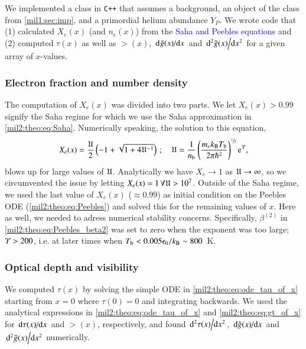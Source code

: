 
We implemented a class in \verb|C++| that assumes a background, an object of the class from \cref{mil1:sec:imp}, and a primordial helium abundance $Y_P$. We wrote code that (1) calculated $X_e(x)$ (and $n_e(x)$) from the \textcolor{blue}{Saha and Peebles equations} and (2) computed $\tau(x)$ as well as $\gt(x)$, $\dv*[]{\tilde{g}(x)}{x}$ and $\dv*[2]{\tilde{g}(x)}{x}$ for a given array of $x$-values. %

\subsubsection{Electron fraction and number density}\label{mil2:imp:sec:Xe_ne}
    The computation of $X_e(x)$ was divided into two parts. We let $X_e(x)>0.99$ signify the Saha regime for which we use the Saha approximation in \cref{mil2:theo:eq:Saha}. Numerically speaking, the solution to this equation, 
    \begin{equation}\label{mil2:imp:eq:sol_Saha}
        X_e(x) = \frac{\mathfrak{U}}{2}\left( -1+\sqrt{1+4\mathfrak{U}^{-1}}\right)\,; \quad 
            \mathfrak{U} = \frac{1}{n_\mathrm{b}} \left( \frac{m_e k_\mathrm{B} T_\mathrm{b} }{2\pi \hbar^2} \right)^{\sfrac{3}{2}} \mathrm{e}^{\varUpsilon},
    \end{equation}
    blows up for large values of $\mathfrak{U}$. Analytically we have $X_e\to 1$ as $\mathfrak{U}\to \infty$, so we circumvented the issue by letting $X_e(x)=1 \,\forall \mathfrak{U} > 10^7$. Outside of the Saha regime, we used the last value of $X_e(x)$ ($\approx 0.99$) as initial condition on the Peebles ODE (\cref{mil2:theo:eq:Peebles}) and solved this for the remaining values of $x$. Here as well, we needed to adress numerical stability concerns. Specifically, $\beta^{(2)}$ in \cref{mil2:theo:eq:Peebles_beta2} was set to zero when the exponent was too large; $\varUpsilon> 200$, i.e. at later times when $T_\mathrm{b} < 0.005 \epsilon_0/k_\mathrm{B} \sim 800$~K.


\subsubsection{Optical depth and visibility}\label{mil2:imp:sec:tau_gt}
    We computed $\tau(x)$ by solving the simple ODE in \cref{mil2:theo:eq:ode_tau_of_x} starting from $x=0$ where $\tau(0)=0$ and integrating backwards. We used the analytical expressions in \cref{mil2:theo:eq:ode_tau_of_x} and \cref{mil2:theo:eq:gt_of_x} for $\dv*{\tau(x)}{x}$ and $\gt(x)$, respectively, and found $\dv*[2]{\tau(x)}{x}$, $\dv*{\tilde{g}(x)}{x}$ and $\dv*[2]{\tilde{g}(x)}{x}$ numerically. 


